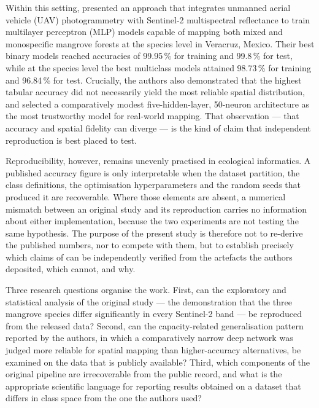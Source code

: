 \documentclass[10pt,twocolumn,a4paper]{article}
\begin{document}
Within this setting, \citet{monterrubio2025} presented an approach that integrates unmanned aerial
vehicle (UAV) photogrammetry with Sentinel-2 multispectral reflectance to train multilayer
perceptron (MLP) models capable of mapping both mixed and monospecific mangrove forests at the
species level in Veracruz, Mexico. Their best binary models reached accuracies of 99.95\,\% for
training and 99.8\,\% for test, while at the species level the best multiclass models attained
98.73\,\% for training and 96.84\,\% for test. Crucially, the authors also demonstrated that the
highest tabular accuracy did not necessarily yield the most reliable spatial distribution, and
selected a comparatively modest five-hidden-layer, 50-neuron architecture as the most trustworthy
model for real-world mapping. That observation --- that accuracy and spatial fidelity can diverge
--- is the kind of claim that independent reproduction is best placed to test.

Reproducibility, however, remains unevenly practised in ecological informatics. A published
accuracy figure is only interpretable when the dataset partition, the class definitions, the
optimisation hyperparameters and the random seeds that produced it are recoverable. Where those
elements are absent, a numerical mismatch between an original study and its reproduction carries no
information about either implementation, because the two experiments are not testing the same
hypothesis. The purpose of the present study is therefore not to re-derive the published numbers,
nor to compete with them, but to establish precisely which claims of \citet{monterrubio2025} can be
independently verified from the artefacts the authors deposited, which cannot, and why.

Three research questions organise the work. First, can the exploratory and statistical analysis of
the original study --- the demonstration that the three mangrove species differ significantly in
every Sentinel-2 band --- be reproduced from the released data? Second, can the capacity-related
generalisation pattern reported by the authors, in which a comparatively narrow deep network was
judged more reliable for spatial mapping than higher-accuracy alternatives, be examined on the data
that is publicly available? Third, which components of the original pipeline are irrecoverable from
the public record, and what is the appropriate scientific language for reporting results obtained
on a dataset that differs in class space from the one the authors used?
\end{document}

